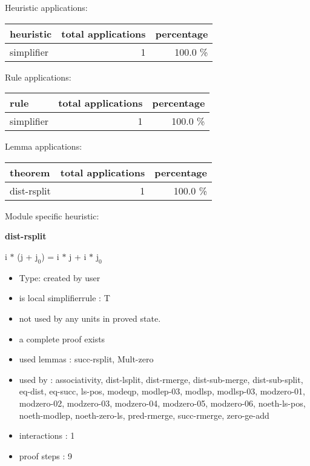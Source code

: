\documentclass[a4paper]{article}
\begin{document}
Heuristic applications:

\begin{supertabular}{l|r|r}
heuristic	& total applications & percentage \\ \hline
simplifier & 1 & 100.0 \% \\

\end{supertabular}

Rule applications:

\begin{supertabular}{l|r|r}
rule	        & total applications & percentage \\ \hline
simplifier & 1 & 100.0 \% \\

\end{supertabular}

Lemma applications:

\begin{supertabular}{l|r|r}
theorem	        & total applications & percentage \\ \hline
dist-rsplit & 1 & 100.0 \% \\

\end{supertabular}

Module specific heuristic:

\pagebreak

{\LARGE\bf dist-rsplit}\label{lemma-dist-rsplit}

\medskip

 \Fol i $*$ (j + $\mbox{j}_{0}$) = i $*$ j + i $*$ $\mbox{j}_{0}$

\begin{itemize}

\item Type: created by user

\item is local simplifierrule : T
\item not used by any units in proved state.
\item       a complete proof exists
\item       used lemmas  : succ-rsplit, Mult-zero
\item       used by      : associativity, dist-lsplit, dist-rmerge, dist-sub-merge, dist-sub-split, eq-dist, eq-succ, ls-pos, modeqp, modlep-03, modlsp, modlsp-03, modzero-01, modzero-02, modzero-03, modzero-04, modzero-05, modzero-06, noeth-ls-pos, noeth-modlep, noeth-zero-ls, pred-rmerge, succ-rmerge, zero-ge-add
\item       interactions : 1
\item       proof steps  : 9
\end{itemize}
\end{document}
